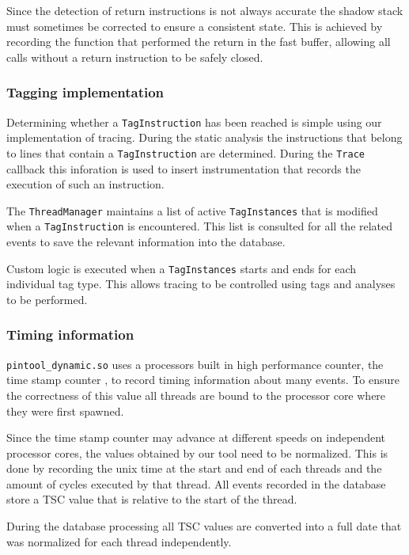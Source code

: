Since the detection of return instructions is not always accurate \cite{pindoc} the shadow stack must sometimes be corrected to ensure a consistent state. This is achieved by recording the function that performed the return in the fast buffer, allowing all calls without a return instruction to be safely closed.

\subsubsection{Tagging implementation}

Determining whether a \texttt{TagInstruction} has been reached is simple using our implementation of tracing. During the static analysis the instructions that belong to lines that contain a \texttt{TagInstruction} are determined. During the \texttt{Trace} callback this inforation is used to insert instrumentation that records the execution of such an instruction.

The \texttt{ThreadManager} maintains a list of active \texttt{TagInstances} that is modified when a \texttt{TagInstruction} is encountered. This list is consulted for all the related events to save the relevant information into the database.

Custom logic is executed when a \texttt{TagInstances} starts and ends for each individual tag type. This allows tracing to be controlled using tags and analyses to be performed.

\subsubsection{Timing information}

\texttt{pintool\_dynamic.so} uses a processors built in high performance counter, the time stamp counter \cite{tsc}, to record timing information about many events. To ensure the correctness of this value all threads are bound to the processor core where they were first spawned.

Since the time stamp counter may advance at different speeds on independent processor cores, the values obtained by our tool need to be normalized. This is done by recording the unix time at the start and end of each threads and the amount of cycles executed by that thread. All events recorded in the database store a TSC value that is relative to the start of the thread.

During the database processing all TSC values are converted into a full date that was normalized for each thread independently.

